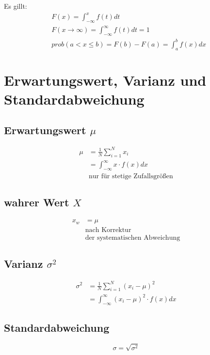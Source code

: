 Es gillt:
\begin{align*}
	&F\left(x\right) = \int_{-\infty}^{x} f\left(t\right)dt\\
	&F\left(x \rightarrow \infty \right) = \int_{-\infty}^{\infty}
	f\left(t\right)dt = 1\\
	&prob\left( a < x \leq b \right) = F\left(b\right) - F\left(a\right) =
	\int_{a}^{b}f\left(x\right)dx
\end{align*}

\section{Erwartungswert, Varianz und Standardabweichung}
\begin{multicols}{2}
	\subsection*{Erwartungswert \texorpdfstring{$\mu$}{}}
		\begin{align*}
			\mu &= \frac{1}{N} \sum_{i = 1}^{N} x_i\\
				&= \int_{-\infty}^{\infty} x \cdot f\left(x\right)dx\\ 
				&\text{nur für stetige Zufallsgrößen}
		\end{align*}
		\vfill
	\subsection*{wahrer Wert \texorpdfstring{$X$}{}}
		\begin{align*}
			x_w &= \mu\\
				&\text{nach Korrektur} \\ 
				&\text{der systematischen Abweichung}
		\end{align*}
		\vspace{5mm}
		\vfill
\end{multicols}

\begin{multicols}{2}
	\subsection*{Varianz \texorpdfstring{$\sigma^2$}{}}
		\begin{align*}
			\sigma^2 &= \frac{1}{N} \sum_{i = 1}^{N}\left( x_i - \mu \right)^2\\
					 &= \int_{-\infty}^{\infty}\left( x_i - \mu \right)^2 \cdot f\left( 
					x \right)dx
		\end{align*}
		\vfill
	\subsection*{Standardabweichung}
		\[\sigma = \sqrt{\sigma^2}\]
		\vspace{5mm}
		\vfill
\end{multicols}

